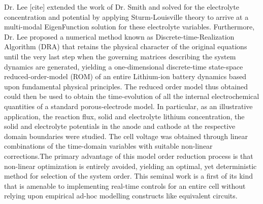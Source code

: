 Dr.  Lee  {[}cite{]}  extended  the  work  of  Dr.  Smith  and  solved  for  the
electrolyte  concentration and  potential  by  applying Sturm-Louisville  theory
to  arrive  at  a  multi-modal  EigenFunction  solution  for  these  electrolyte
variables.  Furthermore,   Dr.  Lee  proposed   a  numerical  method   known  as
Discrete-time-Realization Algorithm (DRA) that retains the physical character of
the original  equations until  the very  last step  when the  governing matrices
describing  the  system  dynamics  are  generated,  yielding  a  one-dimensional
discrete-time  state-space reduced-order-model  (ROM) of  an entire  Lithium-ion
battery dynamics based  upon fundamental physical principles.  The reduced order
model thus obtained could  then be used to obtain the  time-evolution of all the
internal  electrochemical quantities  of a  standard porous-electrode  model. In
particular,  as  an  illustrative  application, the  reaction  flux,  solid  and
electrolyte lithium concentration,  the solid and electrolyte  potentials in the
anode and  cathode at the  respective domain  boundaries were studied.  The cell
voltage was  obtained through linear  combinations of the  time-domain variables
with suitable non-linear  corrections.The primary advantage of  this model order
reduction process is that non-linear  optimization is entirely avoided, yielding
an optimal,  yet deterministic method  for selection  of the system  order. This
seminal work is a  first of its kind that is  amenable to implementing real-time
controls  for an  entire cell  without relying  upon empirical  ad-hoc modelling
constructs like equivalent circuits.


